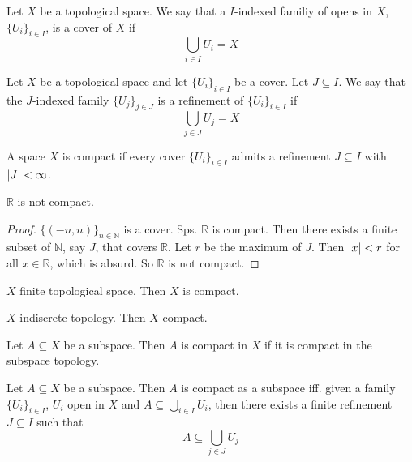 \begin{definition}[cover]
   Let \( X \) be a topological space. 
   We say that a \( I \)-indexed familiy
   of opens in \( X \), \( \{ U_i  \}_{i \in I} \),
   is a cover of \( X \) if
   \[
     \bigcup_{i\in I} U_i = X
   \]
\end{definition}

\begin{definition}[refinement]
   Let \( X \) be a topological space
   and let \( \{ U_i  \}_{i\in I}  \)
   be a cover.
   Let \( J \subseteq I \).
   We say that the \( J \)-indexed
   family \( \{ U_j \}_{j \in J} \)
   is a refinement of \( \{ U_i \}_{i \in I} \)
   if
   \[
     \bigcup_{j \in J} U_j = X
   \]
\end{definition}

\begin{definition}
   A space \( X \) is compact if
   every cover \( \{ U_i \}_{i \in I}  \)
   admits a refinement \( J \subseteq I \)
   with \( \left\lvert{J}\right\rvert < \infty \).
\end{definition}

\begin{nonexample}
   \( \mathbb{R} \) is not compact. 
\end{nonexample}

\begin{proof}
  \( \{ (-n, n) \}_{n \in \mathbb{N}}  \) is a cover.
  Sps. \( \mathbb{R} \) is compact.
  Then there exists a finite subset of \( \mathbb{N} \), say \( J \),
  that covers \( \mathbb{R} \).
  Let \( r \) be the maximum of \( J \).
  Then \( \left\lvert{x}\right\rvert < r \) for all \( x \in \mathbb{R} \),
  which is absurd.
  So \( \mathbb{R} \) is not compact.
\end{proof}

\begin{example}
    \( X \) finite topological space. Then \( X \) is compact.
\end{example}

\begin{example}
   \( X \) indiscrete topology. Then \( X \) compact. 
\end{example}

\begin{definition}
    Let \( A \subseteq X \) be a subspace.
    Then \( A \) is compact in \( X \) 
    if it is compact in the subspace topology.
\end{definition}

\begin{lemma}
  \label{lma:subspace_compact}
    Let \( A \subseteq X  \) be a subspace.
    Then \( A \) is compact as a subspace iff.
    given a family \( \{ U_i \}_{i \in I} \), \( U_i \)
    open in \( X \) and \( A \subseteq \bigcup_{i \in I} U_i \), then
    there exists a finite refinement \( J \subseteq I \) such that
    \[
      A \subseteq \bigcup_{j \in J} U_j
    \]
\end{lemma}

